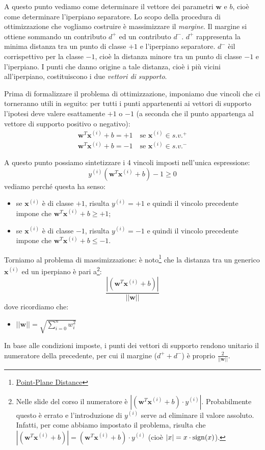 A questo punto vediamo come determinare il vettore dei parametri $\mathbf{w}$ e $b$, cioè come determinare l'iperpiano separatore. Lo scopo della procedura di ottimizzazione che vogliamo costruire è massimizzare il \emph{margine}. Il margine si ottiene sommando un contributo $d^+$ ed un contributo $d^-$. $d^+$ rappresenta la minima distanza tra un punto di classe $+1$ e l'iperpiano separatore. $d^-$ èil corrispettivo per la classe $-1$, cioè la distanza minore tra un punto di classe $-1$ e l'iperpiano. I punti che danno origine a tale distanza, cioè i più vicini all'iperpiano, costituiscono i due \emph{vettori di supporto}.

Prima di formalizzare il problema di ottimizzazione, imponiamo due vincoli che ci torneranno utili in seguito: per tutti i punti appartenenti ai vettori di supporto l'ipotesi deve valere esattamente $+1$ o $-1$ (a seconda che il punto appartenga al vettore di supporto positivo o negativo):
\begin{gather*}
\mathbf{w}^T \mathbf{x}^{(i)} + b = +1 \quad \text{se }  \mathbf{x}^{(i)} \in s.v.^+\\
\mathbf{w}^T \mathbf{x}^{(i)} + b = -1 \quad \text{se }  \mathbf{x}^{(i)} \in s.v.^-
\end{gather*}

A questo punto possiamo sintetizzare i 4 vincoli imposti nell'unica espressione:
\begin{equation*}
y^{(i)}\left(\mathbf{w}^T \mathbf{x}^{(i)} + b\right) -1 \geq 0
\end{equation*}
vediamo perché questa ha senso:
\begin{itemize}
\item se  $\mathbf{x}^{(i)}$ è di classe $+1$, risulta $y^{(i)}=+1$ e quindi il vincolo precedente impone che $\mathbf{w}^T \mathbf{x}^{(i)} + b \geq +1$;
\item se  $\mathbf{x}^{(i)}$ è di classe $-1$, risulta $y^{(i)}=-1$ e quindi il vincolo precedente impone che $\mathbf{w}^T \mathbf{x}^{(i)} + b \leq -1$.
\end{itemize}
Torniamo al problema di massimizzazione: è noto\footnote{\href{http://mathworld.wolfram.com/Point-PlaneDistance.html}{Point-Plane Distance}}  che la distanza tra un generico $\mathbf{x}^{(i)}$ ed un iperpiano è pari a\footnote{Nelle slide del corso il numeratore è $|(\mathbf{w}^T \mathbf{x}^{(i)} + b) \cdot  y^{(i)}|$. Probabilmente questo è errato e l'introduzione di $y^{(i)}$ serve ad eliminare il valore assoluto. Infatti, per come abbiamo impostato il problema, risulta che $|(\mathbf{w}^T \mathbf{x}^{(i)} + b)| = (\mathbf{w}^T \mathbf{x}^{(i)} + b) \cdot  y^{(i)}$ (cioè $|x| = x \cdot \operatorname*{sign}(x)$).}:
\begin{equation*}
\frac{ |(\mathbf{w}^T \mathbf{x}^{(i)} + b)|} {||\mathbf{w}||}
\end{equation*}
dove ricordiamo che:
\begin{itemize}
\item $||\mathbf{w}|| = \sqrt{\sum_{i=0}^n{w_i^2}}$
\end{itemize}
In base alle condizioni imposte, i punti dei vettori di supporto rendono unitario il numeratore della precedente, per cui il margine ($d^+ + d^-$) è proprio $\frac{2}{||\mathbf{w}||}$.

